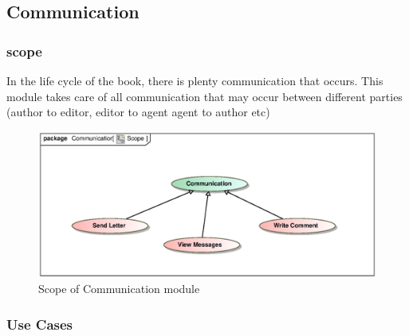 \clearpage
\subsection{Communication}

\subsubsection{scope}
\par{In the life cycle of the book, there is plenty communication that occurs. This module takes care of all communication that may occur between different parties (author to editor, editor to agent agent to author etc)}

\begin{figure}[h]
\includegraphics[scale=0.9]{epsImages/Communication/CommunicationScope.eps}
\caption{Scope of Communication module}
\end{figure}

\newpage
\subsubsection{Use Cases}

